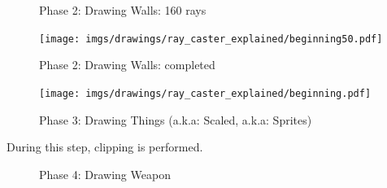  
\begin{figure}[H]
 \centering
 \caption{Phase 2: Drawing Walls: 160 rays}  
\end{figure}
 \begin{minipage}{.4\textwidth}
 \end{minipage}
\begin{minipage}{.6\textwidth}
\begin{figure}[H]
  \centering
 \texttt{[image: imgs/drawings/ray\_caster\_explained/beginning50.pdf]}
   
\end{figure}
\end{minipage}



 
 \begin{figure}[H]
\centering
 \caption{Phase 2: Drawing Walls: completed} 
 \end{figure}
\begin{minipage}{.4\textwidth}
 \end{minipage}
\begin{minipage}{.6\textwidth}
\begin{figure}[H]
  \centering
 \texttt{[image: imgs/drawings/ray\_caster\_explained/beginning.pdf]}
   
\end{figure}
\end{minipage}




 
 
 \begin{figure}[H]
\centering
 \caption{Phase 3: Drawing Things (a.k.a: Scaled, a.k.a: Sprites)} 
 \end{figure}
During this step, clipping is performed.




 \begin{figure}[H]
\centering
 \caption{Phase 4: Drawing Weapon} 
 \end{figure}
 













